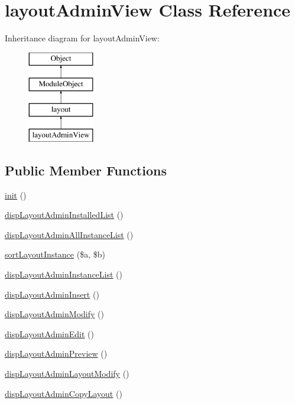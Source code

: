 \hypertarget{classlayoutAdminView}{}\section{layout\+Admin\+View Class Reference}
\label{classlayoutAdminView}
Inheritance diagram for layout\+Admin\+View\+:\begin{figure}[H]
\begin{center}
\leavevmode
\includegraphics[height=4.000000cm]{classlayoutAdminView}
\end{center}
\end{figure}
\subsection*{Public Member Functions}
\begin{DoxyCompactItemize}
\item 
\hyperlink{classlayoutAdminView_a572826e03a68707b409298b63d438d5a}{init} ()
\item 
\hyperlink{classlayoutAdminView_acad8194900695a9aa48ff6dca1435dd3}{disp\+Layout\+Admin\+Installed\+List} ()
\item 
\hyperlink{classlayoutAdminView_a278b148cb2673f86c08fe932b1db38e8}{disp\+Layout\+Admin\+All\+Instance\+List} ()
\item 
\hyperlink{classlayoutAdminView_ae962bf1da94055c92d4fbb6a1bc66458}{sort\+Layout\+Instance} (\$a, \$b)
\item 
\hyperlink{classlayoutAdminView_ab392ea5f53d762ac9da15fe6d40c1e6b}{disp\+Layout\+Admin\+Instance\+List} ()
\item 
\hyperlink{classlayoutAdminView_a8b9a9218b2de78d6a0578471852310b0}{disp\+Layout\+Admin\+Insert} ()
\item 
\hyperlink{classlayoutAdminView_a96a02667575c453953a50cc279443785}{disp\+Layout\+Admin\+Modify} ()
\item 
\hyperlink{classlayoutAdminView_a21250397a3190ca81f64d8ad9af3fff8}{disp\+Layout\+Admin\+Edit} ()
\item 
\hyperlink{classlayoutAdminView_a0c3520a579bb0bbdf1975273c3c6036c}{disp\+Layout\+Admin\+Preview} ()
\item 
\hyperlink{classlayoutAdminView_a1be4548859d4f3a913b33c4e8b395f51}{disp\+Layout\+Admin\+Layout\+Modify} ()
\item 
\hyperlink{classlayoutAdminView_a48e095b862b7cb1482e94fec3c7624cc}{disp\+Layout\+Admin\+Copy\+Layout} ()
\end{DoxyCompactItemize}
